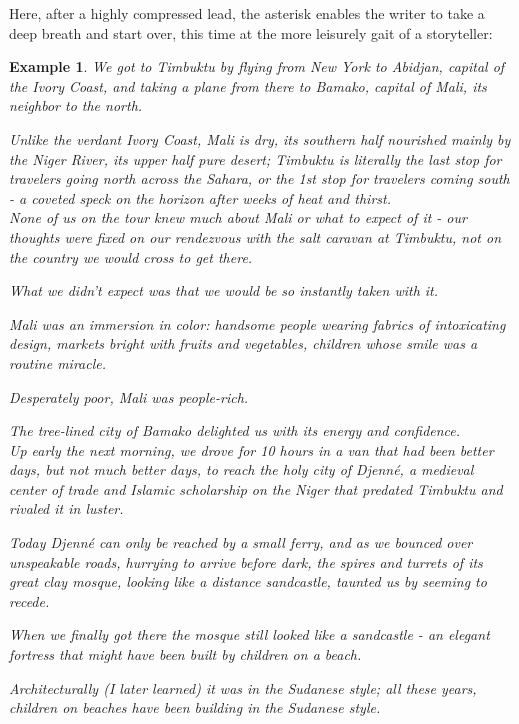 \documentclass{book}
\numberwithin{equation}{section}
\newtheorem{example}{Example}[chapter]
\begin{document}
Here, after a highly compressed lead, the asterisk enables the writer to take a deep breath and start over, this time at the more leisurely gait of a storyteller:
\begin{example}
    We got to Timbuktu by flying from New York to Abidjan, capital of the Ivory Coast, and taking a plane from there to Bamako, capital of Mali, its neighbor to the north.
    
    Unlike the verdant Ivory Coast, Mali is dry, its southern half nourished mainly by the Niger River, its upper half pure desert; Timbuktu is literally the last stop for travelers going north across the Sahara, or the 1st stop for travelers coming south - a coveted speck on the horizon after weeks of heat and thirst.
    \\
    
    None of us on the tour knew much about Mali or what to expect of it - our thoughts were fixed on our rendezvous with the salt caravan at Timbuktu, not on the country we would cross to get there.
    
    What we didn't expect was that we would be so instantly taken with it.
    
    Mali was an immersion in color: handsome people wearing fabrics of intoxicating design, markets bright with fruits and vegetables, children whose smile was a routine miracle.
    
    Desperately poor, Mali was people-rich.
    
    The tree-lined city of Bamako delighted us with its energy and confidence.
    \\
    
    Up early the next morning, we drove for 10 hours in a van that had been better days, but not much better days, to reach the holy city of Djenn\'e, a medieval center of trade and Islamic scholarship on the Niger that predated Timbuktu and rivaled it in luster.
    
    Today Djenn\'e can only be reached by a small ferry, and as we bounced over unspeakable roads, hurrying to arrive before dark, the spires and turrets of its great clay mosque, looking like a distance sandcastle, taunted us by seeming to recede.
    
    When we finally got there the mosque still looked like a sandcastle - an elegant fortress that might have been built by children on a beach.
    
    Architecturally (I later learned) it was in the Sudanese style; all these years, children on beaches have been building in the Sudanese style.
    

\end{example}
\end{document}
